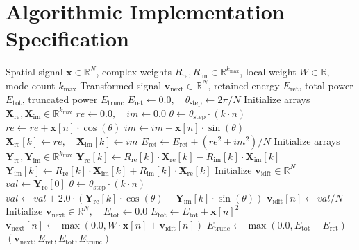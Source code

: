 \documentclass[11pt,a4paper]{article}
\theoremstyle{definition}
\begin{document}
\section{Algorithmic Implementation Specification}

\begin{algorithm}[H]
\caption{Fourier Neural Operator Layer Forward Pass}
\begin{algorithmic}[1]
\Require Spatial signal $\mathbf{x} \in \mathbb{R}^N$, complex weights $R_{\text{re}}, R_{\text{im}} \in \mathbb{R}^{k_{\max}}$, local weight $W \in \mathbb{R}$, mode count $k_{\max}$
\Ensure Transformed signal $\mathbf{v}_{\text{next}} \in \mathbb{R}^N$, retained energy $E_{\text{ret}}$, total power $E_{\text{tot}}$, truncated power $E_{\text{trunc}}$
\State $E_{\text{ret}} \gets 0.0, \quad \theta_{\text{step}} \gets 2\pi / N$
\State Initialize arrays $\mathbf{X}_{\text{re}}, \mathbf{X}_{\text{im}} \in \mathbb{R}^{k_{\max}}$
 
    \State $re \gets 0.0, \quad im \gets 0.0$
        \State $\theta \gets \theta_{\text{step}} \cdot (k \cdot n)$
        \State $re \gets re + \mathbf{x}[n] \cdot \cos(\theta)$
        \State $im \gets im - \mathbf{x}[n] \cdot \sin(\theta)$
    \EndFor
    \State $\mathbf{X}_{\text{re}}[k] \gets re, \quad \mathbf{X}_{\text{im}}[k] \gets im$
    \State $E_{\text{ret}} \gets E_{\text{ret}} + (re^2 + im^2) / N$
\EndFor
\State Initialize arrays $\mathbf{Y}_{\text{re}}, \mathbf{Y}_{\text{im}} \in \mathbb{R}^{k_{\max}}$
 
    \State $\mathbf{Y}_{\text{re}}[k] \gets R_{\text{re}}[k] \cdot \mathbf{X}_{\text{re}}[k] - R_{\text{im}}[k] \cdot \mathbf{X}_{\text{im}}[k]$
    \State $\mathbf{Y}_{\text{im}}[k] \gets R_{\text{re}}[k] \cdot \mathbf{X}_{\text{im}}[k] + R_{\text{im}}[k] \cdot \mathbf{X}_{\text{re}}[k]$
\EndFor
\State Initialize $\mathbf{v}_{\text{idft}} \in \mathbb{R}^N$
 
    \State $val \gets \mathbf{Y}_{\text{re}}[0]$
        \State $\theta \gets \theta_{\text{step}} \cdot (k \cdot n)$
        \State $val \gets val + 2.0 \cdot (\mathbf{Y}_{\text{re}}[k] \cdot \cos(\theta) - \mathbf{Y}_{\text{im}}[k] \cdot \sin(\theta))$
    \EndFor
    \State $\mathbf{v}_{\text{idft}}[n] \gets val / N$
\EndFor
\State Initialize $\mathbf{v}_{\text{next}} \in \mathbb{R}^N, \quad E_{\text{tot}} \gets 0.0$
 
    \State $E_{\text{tot}} \gets E_{\text{tot}} + \mathbf{x}[n]^2$
    \State $\mathbf{v}_{\text{next}}[n] \gets \max(0.0, W \cdot \mathbf{x}[n] + \mathbf{v}_{\text{idft}}[n])$
\EndFor
\State $E_{\text{trunc}} \gets \max(0.0, E_{\text{tot}} - E_{\text{ret}})$
\State \Return $(\mathbf{v}_{\text{next}}, E_{\text{ret}}, E_{\text{tot}}, E_{\text{trunc}})$
\end{algorithmic}
\end{algorithm}
\end{document}
